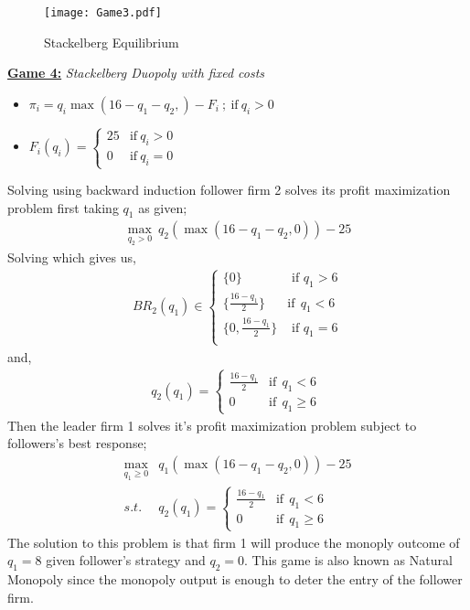 \documentclass[10pt,leqno]{report}
\begin{document}
\begin{figure}[H]
    \centering
     \texttt{[image: Game3.pdf]}
    \caption{Stackelberg Equilibrium }
\end{figure} 
\pagebreak
\textbf{\underline{Game 4:}} \textit{Stackelberg Duopoly with fixed costs} \\
\begin{tcolorbox}
    \begin{itemize}
        \item \(\pi_{i}=q_{i}\max(16-q_{1}-q_{2},)-F_{i}\ ; \ \text{if} \ q_{i}>0\)
        \item \(F_{i}(q_{i})=\begin{cases}
            25 & \text{if} \ q_{i}>0 \\
            0 & \text{if} \ q_{i}=0
        \end{cases}\)
    \end{itemize}
\end{tcolorbox}
Solving using backward induction follower firm 2 solves its profit maximization problem first taking \(q_{1}\) as given;\\
\begin{align*}
    \max_{q_{2}>0} \ q_{2}(\max(16-q_{1}-q_{2},0))-25 
\end{align*}
Solving which gives us, \\
\begin{eqnarray*}
    BR_{2}(q_{1})\in \begin{cases}
        \{0\} & \text{ if } q_{1} > 6\\
        \{\frac{16-q_{1}}{2}\} &  \text{if} \ \ q_{1} < 6\ \\
        \{ 0, \frac{16-q_1}{2}\} & \text{ if } q_{1} = 6 \\
    \end{cases}
\end{eqnarray*}
and, 
\begin{eqnarray*}
    q_{2}(q_{1})=\begin{cases}
        \frac{16-q_{1}}{2} &  \text{if} \ \ q_{1} < 6\ \\
        0  & \text{if} \ \ q_{1}\geq 6
    \end{cases}
\end{eqnarray*}
Then the leader firm 1 solves it's profit maximization problem subject to followers's best response;
\begin{eqnarray*}
    \max_{q_{1}\geq 0} & q_{1}(\max(16-q_{1}-q_{2},0))-25 \\
    s.t. & q_{2}(q_{1})=\begin{cases}
        \frac{16-q_{1}}{2} &  \text{if} \ \ q_{1} < 6 \\
        0  & \text{if} \ \ q_{1}\geq 6
    \end{cases} 
\end{eqnarray*}
The solution to this problem is that firm 1 will produce the monoply outcome of \(q_{1}=8\) given follower's strategy and \(q_{2}=0\). This game is also known as Natural Monopoly since the monopoly output is enough to deter the entry of the follower firm. 
\linebreak
\end{document}

